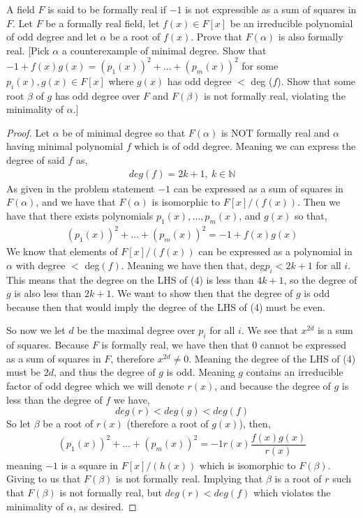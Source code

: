 \documentclass[11pt]{article}
\newenvironment{problem}[2][Problem\!]{\begin{tcolorbox}\begin{trivlist}
\item[\hskip \labelsep {\bfseries #1}\hskip \labelsep {\bfseries #2}]}{\end{trivlist}\end{tcolorbox}}
\newcommand{\nn}{\mathbb N}   %
\begin{document}
\begin{problem}{13.2.15}
    A field $F$ is said to be formally real if $-1$ is not expressible as a sum of squares in $F$. Let $F$ be a formally real field, let $f(x) \in F[x]$ be an irreducible polynomial of odd degree and let $\alpha$ be a root of $f(x)$. Prove that $F(\alpha)$ is also formally real. [Pick $\alpha$ a counterexample of minimal degree. Show that $-1 + f(x)g(x) = (p_1(x))^{2}+ \dots + (p_m(x))^{2}$ for some $p_i(x), g(x)\in F[x]$ where $g(x)$ has odd degree $<$ deg ($f$). Show that some root $\beta$ of $g$ has odd degree over $F$ and $F(\beta)$ is not formally real, violating the minimality of $\alpha$.]
\end{problem}
\begin{proof}
    Let $\alpha$ be of minimal degree so that $F(\alpha)$ is NOT formally real and $\alpha$ having minimal polynomial $f$ which is of odd degree. Meaning we can express the degree of said $f$ as,
    \begin{align*}
        deg(f) = 2k +1, \ k \in \nn
    \end{align*}
    As given in the problem statement $-1$ can be expressed as a sum of squares in $F(\alpha)$, and we have that $F(\alpha)$ is isomorphic to $F[x]/(f(x))$. Then we have that there exists polynomials $p_1(x), \dots , p_m(x)$, and $g(x)$ so that,
    \begin{align}
        (p_1(x))^{2} + \dots + (p_m(x))^{2} = -1 + f(x)g(x)
    \end{align}
    We know that elements of $F[x]/(f(x))$ can be expressed as a polynomial in $\alpha$ with degree $<$ deg$(f)$. Meaning we have then that, deg$p_i < 2k + 1$ for all $i$. This means that the degree on the LHS of (4) is less than $4k + 1$, so the degree of $g$ is also less than $2k + 1$. We want to show then that the degree of $g$ is odd because then that would imply the degree of the LHS of (4) must be even. 

    So now we let $d$ be the maximal degree over $p_i$ for all $i$. We see that $x^{2d}$ is a sum of squares. Because $F$ is formally real, we have then that $0$ cannot be expressed as a sum of squares in $F$, therefore $x^{2d} \neq 0$. Meaning the degree of the LHS of (4) must be $2d$, and thus the degree of $g$ is odd. Meaning $g$ contains an irreducible factor of odd degree which we will denote $r(x)$, and because the degree of $g$ is less than the degree of $f$ we have,
    \[deg(r) < deg(g) < deg(f)\]
    So let $\beta$ be a root of $r(x)$ (therefore a root of $g(x)$), then,
    \begin{align*}
        (p_1(x))^{2} + \dots + (p_m(x))^{2}  = -1 r(x)\dfrac{f(x)g(x)}{r(x)}
    \end{align*}
    meaning $-1$ is a square in $F[x]/(h(x))$ which is isomorphic to $F(\beta)$. Giving to us that $F(\beta)$ is not formally real. Implying that $\beta$ is a root of $r$ such that $F(\beta)$ is not formally real, but $deg(r) < deg(f)$ which violates the minimality of $\alpha$, as desired. 
\end{proof}
\end{document}
